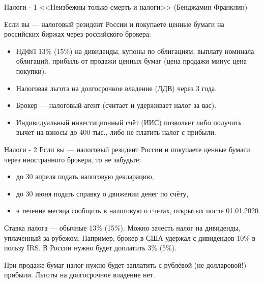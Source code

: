 \documentclass{beamer}
\begin{document}
\begin{frame}{Налоги - 1}
\justify
<<Неизбежны только смерть и налоги>> (Бенджамин Франклин)

\justify
Если вы --- налоговый резидент России и покупаете ценные бумаги на российских биржах через российского брокера:
\begin{itemize}
\justifying
\item НДФЛ 13\% (15\%) на дивиденды, купоны по облигациям, выплату номинала облигаций, прибыль от продажи ценных бумаг (цена продажи минус цена покупки).
\item Налоговая льгота на долгосрочное владение (ЛДВ) через 3 года.
\item Брокер --- налоговый агент (считает и удерживает налог за вас).
\item Индивидуальный инвестиционный счёт (ИИС) позволяет либо получить вычет на взносы до 400 тыс., либо не платить налог с прибыли.
\end{itemize}
\end{frame}



\begin{frame}{Налоги - 2}
\justify
Если вы --- налоговый резидент России и покупаете ценные бумаги через иностранного брокера, то не забудьте:
\begin{itemize}
\justifying
\item до 30 апреля подать налоговую декларацию,
\item до 30 июня подать справку о движении денег по счёту,
\item в течение месяца сообщить в налоговую о счетах, открытых после 01.01.2020. 
\end{itemize}

\justify
Ставка налога --- обычные 13\% (15\%). Можно зачесть налог на дивиденды, уплаченный за рубежом. Например, брокер в США удержал с дивидендов 10\% в пользу IRS. В России нужно будет доплатить 3\% (5\%).

\justify
При продаже бумаг налог нужно будет заплатить с рублёвой (не долларовой!) прибыли. Льготы на долгосрочное владение нет. 
\end{frame}
\end{document}
